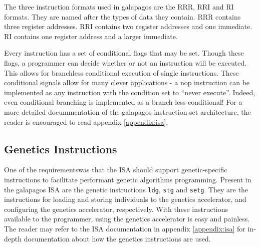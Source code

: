The three instruction formats used in \Gls{galapagos} are the RRR, RRI and RI formats.
They are named after the types of data they contain.
RRR contains three register addresses.
RRI contains two register addresses and one immediate.
RI contains one register address and a larger immediate.

Every instruction has a set of conditional flags that may be set.
Though these flags, a programmer can decide whether or not an instruction will be executed.
This allows for branchless conditional execution of single instructions.
These conditional signals allow for many clever applications - a \gls{nop} instruction can be implemented as any instruction with the condition set to ``never execute''.
Indeed, even conditional branching is implemented as a branch-less conditional!
For a more detailed docummentation of the \gls{galapagos} instruction set architecture, the reader is encouraged to read appendix \vref{appendix:isa}.


\subsection{Genetics Instructions}

One of the requirements\cn was that the ISA should support genetic-specific instructions to facilitate performant genetic algorithms programming.
Present in the \Gls{galapagos} ISA are the genetic instructions \texttt{ldg}, \texttt{stg} and \texttt{setg}.
They are the instructions for loading and storing \glspl{individual} to the genetics accelerator, and configuring the genetics accelerator, respectively.
With these instructions available to the programmer, using the genetics accelerator is easy and painless.
The reader may refer to the ISA documentation in appendix \vref{appendix:isa} for in-depth documentation about how the genetics instructions are used.

